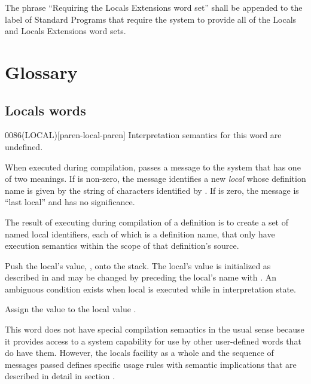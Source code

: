 The phrase ``Requiring the Locals Extensions word set'' shall be
appended to the label of Standard Programs that require the system
to provide all of the Locals and Locals Extensions word sets.

\pagebreak
\section{Glossary} %
\vspace{1ex}

\subsection{Locals words} %
\vspace{1ex}


\begin{worddef}[LOCAL]{0086}{(LOCAL)}[paren-local-paren]
\interpret
	Interpretation semantics for this word are undefined.

\execute

	When executed during compilation,  passes a
	message to the system that has one of two meanings. If 
	is non-zero, the message identifies a new \emph{local} whose
	definition name is given by the string of characters identified
	by . If  is zero, the message is ``last
	local'' and  has no significance.

	The result of executing  during compilation of a
	definition is to create a set of named local identifiers, each
	of which is a definition name, that only have execution
	semantics within the scope of that definition's source.

\execute[local]

	Push the local's value, , onto the stack. The local's
	value is initialized as described in  and may be changed by preceding the local's
	name with . An ambiguous condition exists when local is
	executed while in interpretation state.

\item[\uline{\emph{local} Interpretation}]

 

	Assign the value  to the local value .

\note
	This word does not have special compilation semantics in the
	usual sense because it provides access to a system capability
	for use by other user-defined words that do have them. However,
	the locals facility as a whole and the sequence of messages
	passed defines specific usage rules with semantic implications
	that are described in detail in section
	.


\end{worddef}
